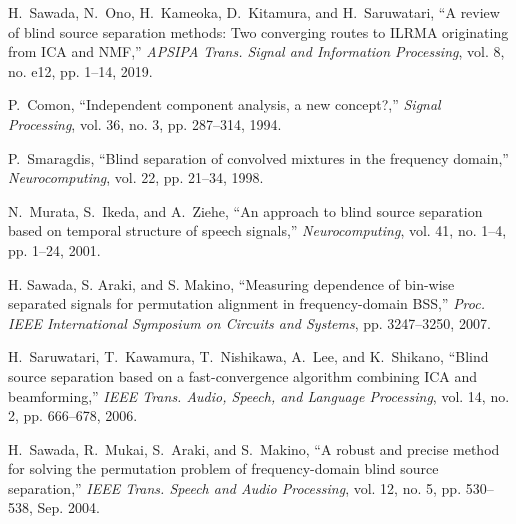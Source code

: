 \documentclass[honka]{nitkagawathesis}%
\begin{document}




\backmatter



\begin{thebibliography}{99}
  
  H.~Sawada, N.~Ono, H.~Kameoka, D.~Kitamura, and H.~Saruwatari, ``A review of blind source separation methods: Two converging routes to ILRMA originating from ICA and NMF,'' \textit {APSIPA Trans. Signal and Information Processing}, vol. 8, no. e12, pp. 1--14, 2019.
  
  P.~Comon, ``Independent component analysis, a new concept?,'' \textit{Signal Processing}, vol. 36, no. 3, pp. 287--314, 1994.
  
  P.~Smaragdis, ``Blind separation of convolved mixtures in the frequency domain,'' \textit{Neurocomputing}, vol. 22, pp. 21--34, 1998.
  
  N.~Murata, S.~Ikeda, and A.~Ziehe, ``An approach to blind source separation based on temporal structure of speech signals,''  \textit{Neurocomputing}, vol. 41, no. 1--4, pp. 1--24, 2001.
  
  H. Sawada, S. Araki, and S. Makino, ``Measuring dependence of bin-wise separated signals for permutation alignment in frequency-domain BSS,'' \textit{Proc. IEEE International Symposium on Circuits and Systems}, pp. 3247--3250, 2007.
  
  H.~Saruwatari, T.~Kawamura, T.~Nishikawa, A.~Lee, and K.~Shikano, ``Blind source separation based on a fast-convergence algorithm combining ICA and beamforming,''  \textit{IEEE Trans. Audio, Speech, and Language Processing}, vol. 14, no. 2, pp. 666--678, 2006.
  
  H.~Sawada, R.~Mukai, S.~Araki, and S.~Makino, ``A robust and precise method for solving the permutation problem of frequency-domain blind source separation,''  \textit{IEEE Trans. Speech and Audio Processing}, vol. 12, no. 5, pp. 530--538, Sep. 2004.
  

\end{thebibliography}
\end{document}
